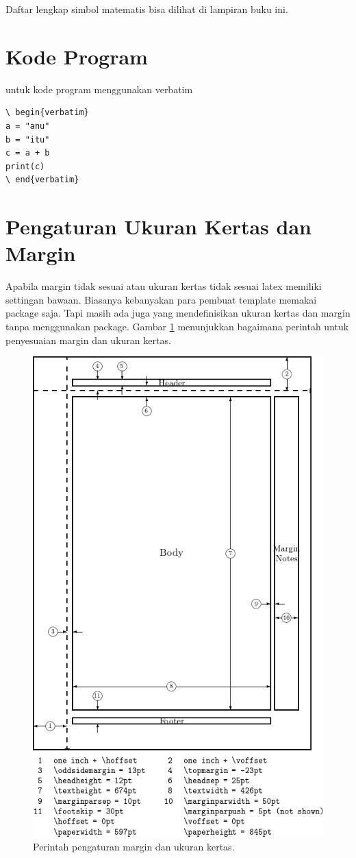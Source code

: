 Daftar lengkap simbol matematis bisa dilihat di lampiran buku ini.



\section{Kode Program}
untuk kode program menggunakan verbatim
\begin{verbatim}
\ begin{verbatim}
a = "anu"
b = "itu"
c = a + b
print(c) 
\ end{verbatim}
\end{verbatim}


\section{Pengaturan Ukuran Kertas dan Margin}
Apabila margin tidak sesuai atau ukuran kertas tidak sesuai latex memiliki settingan bawaan. Biasanya kebanyakan para pembuat template memakai package saja. Tapi masih ada juga yang mendefinisikan ukuran kertas dan margin tanpa menggunakan package. Gambar \ref{marginsize} menunjukkan bagaimana perintah untuk penyesuaian margin dan ukuran kertas.

  	\begin{figure}[ht]
  \centerline{\includegraphics[width=.5\textwidth]
  {figures/custommarginlatex.png}}
  \caption{Perintah pengaturan margin dan ukuran kertas.}
  \label{marginsize}
  \end{figure}


